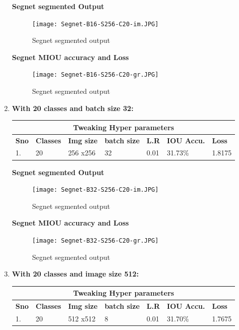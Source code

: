 \documentclass{IEEEtran}
\begin{document}
\begin{enumerate}
\textbf{Segnet segmented Output}

\begin{figure}[h]
    \centering
    \captionsetup{justification=centering}
    \texttt{[image: Segnet-B16-S256-C20-im.JPG]}
    \caption{Segnet segmented output}
    \label{fig:Binary class segmented output}
\end{figure}


\textbf{Segnet MIOU accuracy and Loss}

\begin{figure}[h]
    \centering
    \captionsetup{justification=centering}
    \texttt{[image: Segnet-B16-S256-C20-gr.JPG]}
    \caption{Segnet segmented output}
    \label{fig:Binary class segmented output}
\end{figure}

\newpage

\item \textbf{With 20 classes and batch size 32:}
\newline
\begin{tabular}{ |p{0.6cm}|p{1.2cm}|p{0.6cm}|p{0.6cm}|p{0.6cm}|p{0.8cm}|p{0.8cm}|}
 \hline
 \multicolumn{7}{|c|}{\textbf{Tweaking Hyper parameters}} \\
 \hline
 \textbf{Sno} & \textbf{Classes} & \textbf{Img size} & \textbf{batch size} & \textbf{L.R} & \textbf{IOU Accu.} & \textbf{Loss} \\
 \hline
 1. & 20   & 256 x256   & 32  & 0.01 & 31.73\% & 1.8175 \\
 \hline
\end{tabular}


\textbf{Segnet segmented Output}

\begin{figure}[h]
    \centering
    \captionsetup{justification=centering}
    \texttt{[image: Segnet-B32-S256-C20-im.JPG]}
    \caption{Segnet segmented output}
    \label{fig:Binary class segmented output}
\end{figure}


\textbf{Segnet MIOU accuracy and Loss}

\begin{figure}[h]
    \centering
    \captionsetup{justification=centering}
    \texttt{[image: Segnet-B32-S256-C20-gr.JPG]}
    \caption{Segnet segmented output}
    \label{fig:Binary class segmented output}
\end{figure}

\item \textbf{With 20 classes and image size 512:}
\newline
\begin{tabular}{ |p{0.6cm}|p{1.2cm}|p{0.6cm}|p{0.6cm}|p{0.6cm}|p{0.8cm}|p{0.8cm}|}
 \hline
 \multicolumn{7}{|c|}{\textbf{Tweaking Hyper parameters}} \\
 \hline
 \textbf{Sno} & \textbf{Classes} & \textbf{Img size} & \textbf{batch size} & \textbf{L.R} & \textbf{IOU Accu.} & \textbf{Loss} \\
 \hline
 1. & 20   & 512 x512   & 8  & 0.01 & 31.70\% & 1.7675 \\
 \hline
\end{tabular}



\end{enumerate}
\end{document}
